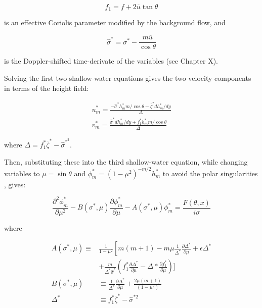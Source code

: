 \documentclass[12pt]{article}
\begin{document}
\begin{equation}
    f_{1} = f + 2 \overline{u} \tan \theta
\end{equation}

is an effective Coriolis parameter modified by the background flow, and

\begin{equation}
    \hat{\sigma}^{*}  =  \sigma^{*} - \frac{m \overline{u}}{\cos \theta}
\end{equation}

is the Doppler-shifted time-derivate of the variables (see Chapter X).

Solving the first two shallow-water equations gives the two velocity components in terms of the height field:

\begin{equation}
  \begin{aligned}
    u_{m}^{*} = \frac{- \hat{\sigma}^{*}h_{m}^{*} m/\cos \theta - \overline{\zeta}^{*} d h_{m}^{*} / d y}{\Delta}\\
    v_{m}^{*} = \frac{\hat{\sigma}^{*} d h_{m}^{*} / d y + f_{1}^{*} h_{m}^{*} m / \cos \theta }{\Delta}
  \end{aligned}
\end{equation}

where $\Delta = f_{1}^{*} \overline{\zeta}^{*} - \hat{\sigma}^{*}^{2}$.

Then, substituting these into the third shallow-water equation, while changing variables to $\mu = \sin \theta$ and $\phi_{m}^{*} = \left(1-\mu^{2}\right)^{-m / 2} h_{m}^{*}$ to avoid the polar singularities \citep{iga2005spherical}, gives:


\begin{equation}
  \frac{\partial^{2} \phi_{m}^{*}}{\partial \mu^{2}}-B\left(\sigma^{*}, \mu\right) \frac{\partial \phi_{m}^{*}}{\partial \mu}-A\left(\sigma^{*}, \mu\right) \phi_{m}^{*}=\frac{F(\theta,x)}{i \sigma}
\end{equation}

where

\begin{equation}
  \begin{aligned} A\left(\sigma^{*}, \mu\right) \equiv & \frac{1}{1-\mu^{2}}\left[m(m+1)-m \mu \frac{1}{\Delta^{*}} \frac{\partial \Delta^{*}}{\partial \mu}+\epsilon \Delta^{*}\right.\\ &+\frac{m}{\Delta^{*} \hat{\sigma}^{*}}\left(f_{1}^{*} \frac{\partial \Delta^{*}}{\partial \mu}-\Delta * \frac{\partial f_{1}^{*}}{\partial \mu}\right) ] \\ B\left(\sigma^{*}, \mu\right) & \equiv \frac{1}{\Delta^{*}} \frac{\partial \Delta^{*}}{\partial \mu}+\frac{2 \mu(m+1)}{\left(1-\mu^{2}\right)} \\ \Delta^{*} & \equiv f_{1}^{*} \overline{\zeta}^{*}-\hat{\sigma}^{* 2} \end{aligned}
\end{equation}
\end{document}
